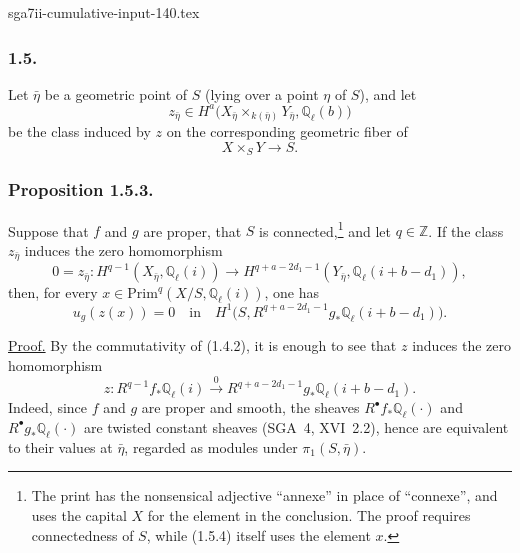 \begin{filecontents*}{sga7ii-cumulative-input-140.tex}
\subsubsection*{1.5.}
Let $\bar\eta$ be a geometric point of $S$ (lying over a point $\eta$ of
$S$), and let
\begin{equation}\tag{1.5.1}
z_{\bar\eta}\in
H^a\bigl(X_{\bar\eta}\times_{k(\bar\eta)}Y_{\bar\eta},
\mathbb Q_\ell(b)\bigr)
\end{equation}
be the class induced by $z$ on the corresponding geometric fiber of
\begin{equation}\tag{1.5.2}
X\times_S Y\longrightarrow S.
\end{equation}

\subsubsection*{Proposition 1.5.3.}
Suppose that $f$ and $g$ are proper, that $S$ is connected,\footnote{The
print has the nonsensical adjective ``annexe'' in place of ``connexe'', and
uses the capital $X$ for the element in the conclusion.  The proof requires
connectedness of $S$, while (1.5.4) itself uses the element $x$.} and let
$q\in\mathbb Z$.  If the class $z_{\bar\eta}$ induces the zero
homomorphism
\begin{equation}\tag{1.5.3}
0=z_{\bar\eta}:H^{q-1}(X_{\bar\eta},\mathbb Q_\ell(i))
\longrightarrow
H^{q+a-2d_1-1}(Y_{\bar\eta},\mathbb Q_\ell(i+b-d_1)),
\end{equation}
then, for every
$x\in\mathrm{Prim}^q(X/S,\mathbb Q_\ell(i))$, one has
\begin{equation}\tag{1.5.4}
u_g(z(x))=0\quad\text{in}\quad
H^1\bigl(S,R^{q+a-2d_1-1}g_*\mathbb Q_\ell(i+b-d_1)\bigr).
\end{equation}

\noindent\underline{Proof.}
By the commutativity of (1.4.2), it is enough to see that $z$ induces the
zero homomorphism
\begin{equation}\tag{1.5.5}
z:R^{q-1}f_*\mathbb Q_\ell(i)
\stackrel{0}{\longrightarrow}
R^{q+a-2d_1-1}g_*\mathbb Q_\ell(i+b-d_1).
\end{equation}
Indeed, since $f$ and $g$ are proper and smooth, the sheaves
$R^\bullet f_*\mathbb Q_\ell(\mathord\cdot)$ and
$R^\bullet g_*\mathbb Q_\ell(\mathord\cdot)$ are twisted constant sheaves
(SGA~4, XVI~2.2), hence are equivalent to their values at $\bar\eta$,
regarded as modules under $\pi_1(S,\bar\eta)$.


\end{filecontents*}
